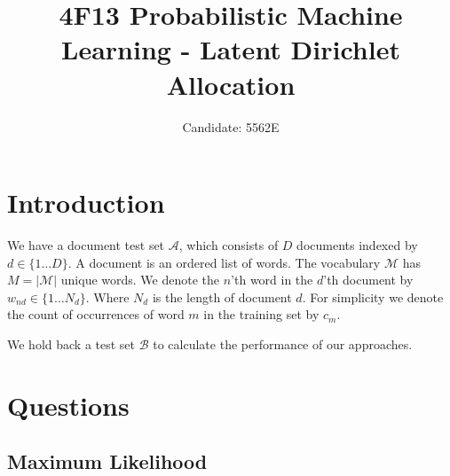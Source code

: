 \documentclass[]{article}
\title{4F13 Probabilistic Machine Learning - Latent Dirichlet Allocation}
\author{Candidate: 5562E}
\newcommand{\Acal}{\mathcal{A}}
\newcommand{\Bcal}{\mathcal{B}}
\newcommand{\Mcal}{\mathcal{M}}
\begin{document}


\setcounter{page}{1}
\maketitle

\tableofcontents

\section{Introduction}

We have a document test set $\Acal$, which consists of $D$ documents indexed by $d \in \{1 \dots D\}$. A document is an ordered list of words. The vocabulary $\Mcal$ has $M=|\Mcal|$ unique words. We denote the $n$'th word in the $d$'th document by $w_{nd} \in \{1 \dots N_d\}$. Where $N_d$ is the length of document $d$. For simplicity we denote the count of occurrences of word $m$ in the training set by $c_m$.

We hold back a test set $\Bcal$ to calculate the performance of our approaches.

\section{Questions}
\subsection{Maximum Likelihood}
\end{document}

